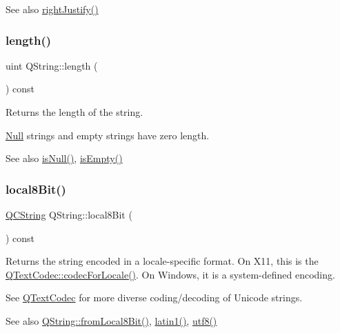 \begin{DoxySeeAlso}{See also}
\mbox{\hyperlink{class_q_string_a77e73231263538edb5b62675471c5e78}{right\+Justify()}} 
\end{DoxySeeAlso}
\mbox{\label{class_q_string_ac431a733d01111059c8364c62ed53270}} 
\subsubsection{\texorpdfstring{length()}{length()}}
{\footnotesize\ttfamily uint Q\+String\+::length (\begin{DoxyParamCaption}{ }\end{DoxyParamCaption}) const\hspace{0.3cm}{\ttfamily [inline]}}

Returns the length of the string.

\mbox{\hyperlink{struct_q_string_1_1_null}{Null}} strings and empty strings have zero length.

\begin{DoxySeeAlso}{See also}
\mbox{\hyperlink{class_q_string_a6a6da156364a32ef91e35f83b1955acc}{is\+Null()}}, \mbox{\hyperlink{class_q_string_aa032d4b5892338beb575a85e59bbbf38}{is\+Empty()}} 
\end{DoxySeeAlso}
\mbox{\label{class_q_string_ac8aa3324210f474d9f515ba9f80b0f68}} 
\subsubsection{\texorpdfstring{local8Bit()}{local8Bit()}}
{\footnotesize\ttfamily \mbox{\hyperlink{class_q_c_string}{Q\+C\+String}} Q\+String\+::local8\+Bit (\begin{DoxyParamCaption}{ }\end{DoxyParamCaption}) const}

Returns the string encoded in a locale-\/specific format. On X11, this is the \mbox{\hyperlink{class_q_text_codec_af21be033ce39428087bb853054f15ff5}{Q\+Text\+Codec\+::codec\+For\+Locale()}}. On Windows, it is a system-\/defined encoding.

See \mbox{\hyperlink{class_q_text_codec}{Q\+Text\+Codec}} for more diverse coding/decoding of Unicode strings.

\begin{DoxySeeAlso}{See also}
\mbox{\hyperlink{class_q_string_ad1175d375e2a8fee8e6411b855c63afb}{Q\+String\+::from\+Local8\+Bit()}}, \mbox{\hyperlink{class_q_string_af9cb186d8ba117c42f31e8235478fe68}{latin1()}}, \mbox{\hyperlink{class_q_string_a6da42912db630af419d216aa0d321ebd}{utf8()}} 
\end{DoxySeeAlso}
\mbox{\label{class_q_string_a77d8e8901007cdda3a71b40d42dbc32c}} 
